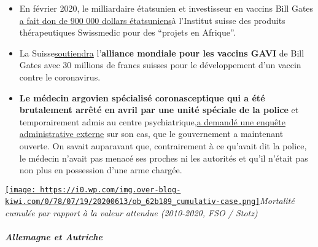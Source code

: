 \begin{itemize}
\item
  En février 2020, le milliardaire étatsunien et investisseur en vaccins
  Bill Gates
  \href{https://www.christoph-pfluger.ch/2020/05/23/der-groesste-impfstoff-investor-schenkt-der-swissmedic-900000-dollar/}{a
  fait don de 900 000 dollars étatsuniens}à l'Institut suisse des
  produits thérapeutiques Swissmedic pour des ``projets en Afrique''.
\item
  La
  Suisse\href{https://www.aargauerzeitung.ch/panorama/schweiz-unterstuetzt-impfallianz-gavi-mit-30-millionen-138082583}{soutiendra}
  l'\textbf{alliance mondiale pour les vaccins GAVI} de Bill Gates avec
  30 millions de francs suisses pour le développement d'un vaccin contre
  le coronavirus.
\item
  \textbf{Le médecin argovien spécialisé coronasceptique qui a été
  brutalement arrêté en avril par une unité spéciale de la police} et
  temporairement admis au centre
  psychiatrique,\href{https://www.aargauerzeitung.ch/aargau/kanton-aargau/polizeieinsatz-wegen-wettinger-arzt-regierung-beschliesst-externe-administrativuntersuchung-137913013}{a
  demandé une enquête administrative externe} sur son cas, que le
  gouvernement a maintenant ouverte. On savait auparavant que,
  contrairement à ce qu'avait dit la police, le médecin n'avait pas
  menacé ses proches ni les autorités et qu'il n'était pas non plus en
  possession d'une arme chargée.
\end{itemize}

\href{http://img.over-blog-kiwi.com/0/78/07/19/20200613/ob_62b189_cumulativ-case.png\#width=1600\&height=755}{\texttt{[image: https://i0.wp.com/img.over-blog-kiwi.com/0/78/07/19/20200613/ob\_62b189\_cumulativ-case.png]}}\emph{Mortalité
cumulée par rapport à la valeur attendue (2010-2020, FSO / Stotz)}

\hypertarget{allemagne-et-autriche}{%
\subparagraph{\texorpdfstring{\textbf{Allemagne et
Autriche}}{Allemagne et Autriche}}\label{allemagne-et-autriche}}

